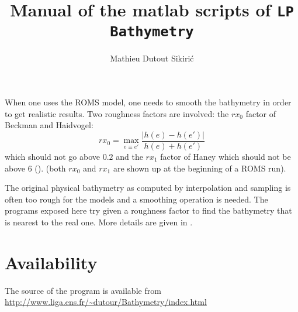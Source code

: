 \documentclass[12pt]{article}
\title{Manual of the matlab scripts of {\tt LP Bathymetry}}
\author{Mathieu Dutout Sikiri\'c}
\begin{document}
\newcommand{\RR}{\ensuremath{\mathbb{R}}}
\newcommand{\NN}{\ensuremath{\mathbb{N}}}
\newcommand{\QQ}{\ensuremath{\mathbb{Q}}}
\newcommand{\CC}{\ensuremath{\mathbb{C}}}
\newcommand{\ZZ}{\ensuremath{\mathbb{Z}}}
\newcommand{\TT}{\ensuremath{\mathbb{T}}}
\newtheorem{proposition}{Proposition}
\newtheorem{theorem}{Theorem}
\newtheorem{corollary}{Corollary}
\newtheorem{lemma}{Lemma}
\newtheorem{problem}{Problem}
\newtheorem{conjecture}{Conjecture}
\newtheorem{claim}{Claim}
\newtheorem{remark}{Remark}
\newtheorem{definition}{Definition}
\newcommand{\qed}{\hfill $\Box$ }
\newcommand{\proof}{\noindent{\bf Proof.}\ \ }



\maketitle


When one uses the ROMS model, one needs to smooth the bathymetry in
order to get realistic results.
Two roughness factors are involved: the $rx_0$ factor of 
Beckman and Haidvogel:
\begin{equation*}
rx_0=\max_{e\equiv e'} \frac{|h(e) - h(e')|}{h(e)+h(e')}
\end{equation*}
which should not go above $0.2$ and the $rx_1$ factor of Haney which
should not be above $6$ (\cite{haney}).
(both $rx_0$ and $rx_1$ are shown up at the beginning of a ROMS run).

The original physical bathymetry as computed by interpolation and 
sampling is often too rough for the models and a smoothing operation
is needed.
The programs exposed here try given a roughness factor to find the
bathymetry that is nearest to the real one. 
More details are given in \cite{lpmeth}.



\section{Availability}

The source of the program is available from \url{http://www.liga.ens.fr/~dutour/Bathymetry/index.html}
\end{document}
